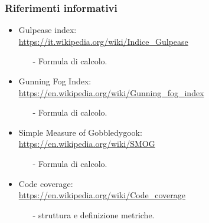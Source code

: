 \subsubsection{Riferimenti informativi}
 \begin{itemize}
 	\item Gulpease index: \\
 		\url{https://it.wikipedia.org/wiki/Indice_Gulpease}
 	\begin{itemize}
 		\item[-] Formula di calcolo.
	\end{itemize}
	\item Gunning Fog Index: \\
		\url{https://en.wikipedia.org/wiki/Gunning_fog_index}
		\begin{itemize}
		\item[-] Formula di calcolo.
		\end{itemize}
	\item Simple Measure of Gobbledygook: \\ 
		 \url{https://en.wikipedia.org/wiki/SMOG}
		 \begin{itemize}
		 	\item[-] Formula di calcolo.
		 \end{itemize}
	\item Code coverage: \\ 
		\url{https://en.wikipedia.org/wiki/Code_coverage}
		\begin{itemize}
		\item[-] struttura e definizione metriche.
		\end{itemize}
\end{itemize}